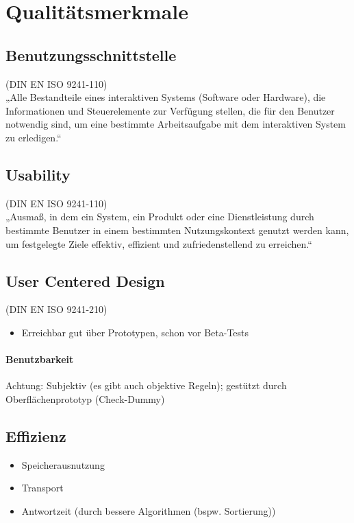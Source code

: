 \documentclass{scrreprt}
\begin{document}
\section{Qualitätsmerkmale}

\subsection{Benutzungsschnittstelle} (DIN EN ISO 9241-110)\\
„Alle Bestandteile eines interaktiven Systems (Software oder Hardware), 
die Informationen und Steuerelemente zur Verfügung stellen,
die für den Benutzer notwendig sind,
um eine bestimmte Arbeitsaufgabe mit dem interaktiven System zu erledigen.“

\subsection{Usability} (DIN EN ISO 9241-110)\\
„Ausmaß, in dem ein System, ein Produkt oder eine Dienstleistung
durch bestimmte Benutzer in einem bestimmten Nutzungskontext genutzt werden kann,
um festgelegte Ziele effektiv, effizient und zufriedenstellend zu erreichen.“

\subsection{User Centered Design} (DIN EN ISO 9241-210)
\begin{itemize}
\item Erreichbar gut über Prototypen, schon vor Beta-Tests
\end{itemize}
\paragraph{Benutzbarkeit} \parskp
Achtung: Subjektiv (es gibt auch objektive Regeln); gestützt durch Oberflächenprototyp (Check-Dummy)

\subsection{Effizienz} 
\begin{itemize}
\item Speicherausnutzung
\item Transport
\item Antwortzeit (durch bessere Algorithmen (bspw. Sortierung))
\end{itemize}
\end{document}
